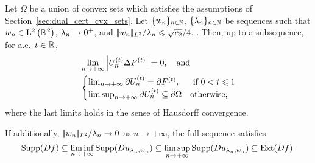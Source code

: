 \begin{thm}\label{thm:union_cvx_sets}
  Let $\Omega$ be a union of convex sets which satisfies the assumptions of Section~\ref{sec:dual_cert_cvx_sets}. %
    Let $\{w_n\}_{n\in\mathbb{N}}$, $\{\lambda_n\}_{n\in\mathbb{N}}$ be sequences such that $w_n\in \mathrm{L}^2\left(\mathbb{R}^2\right)$, $\lambda_n\to 0^+$, and ${|\!| w_n |\!|_{L^2}}/{\lambda_n}\leqslant \sqrt{c_2}/4$. .
  Then, up to a subsequence, for a.e.\ $t\in \mathbb{R}$,
  \begin{align}\label{eq:limtbis}
    &\lim_{n\to+\infty} \left| U_n^{(t)}\Delta F^{(t)} \right| =0,\quad \text{and} \quad \\
    &\begin{cases}
   \lim_{n\to+\infty} \partial U_n^{(t)}=\partial F^{(t)}, & \mbox{ if $0<t\leqslant 1$}\\
   \limsup_{n\to+\infty}  \partial U_n^{(t)}\subseteq \partial \Omega & \mbox{otherwise,}\label{eq:limtter}
\end{cases}
\end{align}
where the last limits holds in the sense of Hausdorff convergence.

If additionally, ${|\!| w_n |\!|_{L^2}}/{\lambda_n}\to 0$ as $n\to +\infty$, the full sequence satisfies
\begin{equation}\label{eq:suppliminfsupsquare}
  \operatorname{Supp}(Df)\subseteq \liminf_{n\to +\infty} \operatorname{Supp}(Du_{\lambda_n,w_n}) \subseteq \limsup_{n\to+\infty} \operatorname{Supp}(Du_{\lambda_n,w_n})\subseteq \operatorname{Ext}(Df).
\end{equation}

\end{thm}
